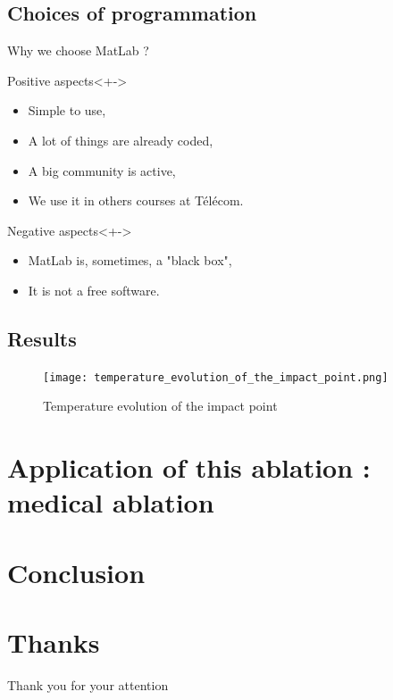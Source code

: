 \documentclass[11pt]{beamer}
\begin{document}
\subsection{Choices of programmation}
\begin{frame}{Why we choose MatLab ?}
\begin{block}{Positive aspects}<+->
\begin{itemize}
\item<+-> Simple to use,
\item<+-> A lot of things are already coded,
\item<+-> A big community is active,
\item<+-> We use it in others courses at Télécom.
\end{itemize}
\end{block}

\begin{block}{Negative aspects}<+->
\begin{itemize}
\item<+-> MatLab is, sometimes, a "black box",
\item<+-> It is not a free software.
\end{itemize}
\end{block}
\end{frame}


\subsection{Results}
\begin{frame}

\begin{figure}[H]
\centering
\texttt{[image: temperature\_evolution\_of\_the\_impact\_point.png]}
\caption{Temperature evolution of the impact point}
\end{figure}

\end{frame}

\begin{frame}

\end{frame}

\section{Application of this ablation : medical ablation}
\begin{frame}

\end{frame}

\section{Conclusion}

\begin{frame}

\end{frame}

\section*{Thanks}
\begin{frame}
\center
\huge{Thank you for your attention}
\end{frame}
\end{document}
